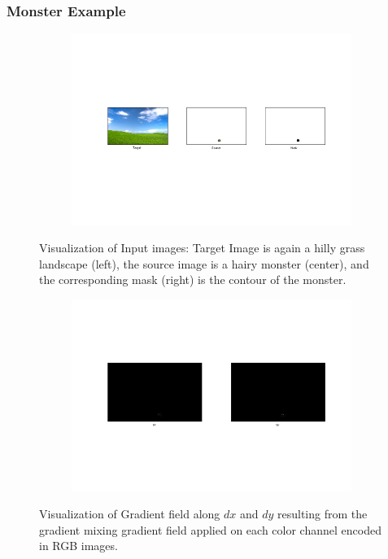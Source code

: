 \documentclass{paper}
\begin{document}
\subsubsection{Monster Example}
\begin{figure}[H]
    \centering
    \begin{subfigure}{1.0\textwidth}
        \includegraphics[width=\textwidth]{../../outputs/p4/seamless_cloning/monster/input}
    \end{subfigure}
    \caption{Visualization of Input images: Target Image is again a hilly grass landscape (left), the source image is a hairy monster (center), and the corresponding mask (right) is the contour of the monster.}
    \label{fig:seamless_cloning_monster_input}       
\end{figure}


\begin{figure}[H]
    \centering
    \begin{subfigure}{1.0\textwidth}
        \includegraphics[width=\textwidth]{../../outputs/p4/seamless_cloning/monster/gradients}
    \end{subfigure}
    \caption{Visualization of Gradient field along $dx$ and $dy$ resulting from the gradient mixing gradient field applied on each color channel encoded in RGB images.}
    \label{fig:seamless_cloning_monster_gradients}       
\end{figure}
\end{document}

